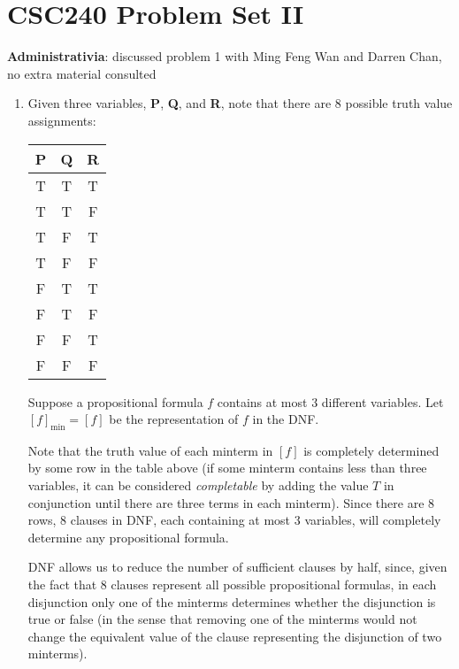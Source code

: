 \documentclass[11pt]{scrartcl}
\begin{document}
\section*{CSC240 Problem Set II}

\linenumbers \textbf{Administrativia}: discussed problem 1 with Ming Feng Wan
and Darren Chan, no extra material consulted
\begin{enumerate}
\item\label{item:1} Given three variables, \textbf{P}, \textbf{Q}, and
  \textbf{R}, note that there are 8 possible truth value assignments:
  \begin{table}[h]
    \centering
    \begin{tabulary}{0.3\textwidth}{C|C|C}
      \textbf{P} & \textbf{Q} & \textbf{R} \\
      \hline
      T          & T          & T          \\
      T          & T          & F          \\
      T          & F          & T          \\
      T          & F          & F          \\
      F          & T          & T          \\
      F          & T          & F          \\
      F          & F          & T          \\
      F          & F          & F
    \end{tabulary}
  \end{table}

  Suppose a propositional formula $f$ contains at most 3 different
  variables. Let $[f]_{\min} = [f]$ be the representation of $f$ in the DNF.

  Note that the truth value of each minterm in $[f]$ is completely
  determined by some row in the table above (if some minterm contains
  less than three variables, it can be considered \textit{completable}
  by adding the value $T$ in conjunction until there are three terms
  in each minterm). Since there are $8$ rows, $8$ clauses in DNF, each
  containing at most 3 variables, will completely determine any
  propositional formula.

  DNF allows us to reduce the number of sufficient clauses by half,
  since, given the fact that 8 clauses represent all possible
  propositional formulas, in each disjunction only one of the minterms
  determines whether the disjunction is true or false (in the sense
  that removing one of the minterms would not change the equivalent
  value of the clause representing the disjunction of two
  minterms).


\end{enumerate}
\end{document}
